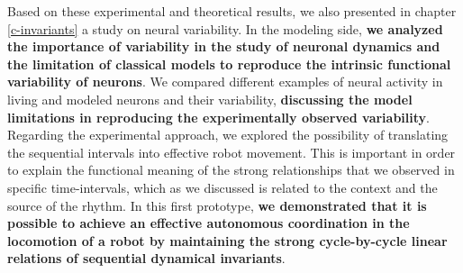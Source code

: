 Based on these experimental and theoretical results, we also presented in chapter \ref{c-invariants} a study on neural variability. In the modeling side, \textbf{we analyzed the importance of variability in the study of neuronal dynamics and the limitation of classical models to reproduce the intrinsic functional variability of neurons}. We compared different examples of neural activity in living and modeled neurons and their variability, \textbf{ discussing the model limitations in reproducing the experimentally observed variability}. Regarding the experimental approach, we explored the possibility of translating the sequential intervals into effective robot movement. This is important in order to explain the functional meaning of the strong relationships that we observed in specific time-intervals, which as we discussed is related to the context and the source of the rhythm. In this first prototype, \textbf{we demonstrated that it is possible to achieve an effective autonomous coordination in the locomotion of a robot by maintaining the strong cycle-by-cycle linear relations of sequential dynamical invariants}.


